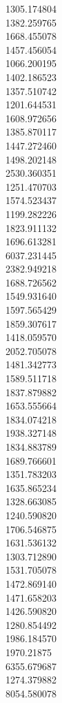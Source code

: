 1305.174804\\
1382.259765\\
1668.455078\\
1457.456054\\
1066.200195\\
1402.186523\\
1357.510742\\
1201.644531\\
1608.972656\\
1385.870117\\
1447.272460\\
1498.202148\\
2530.360351\\
1251.470703\\
1574.523437\\
1199.282226\\
1823.911132\\
1696.613281\\
6037.231445\\
2382.949218\\
1688.726562\\
1549.931640\\
1597.565429\\
1859.307617\\
1418.059570\\
2052.705078\\
1481.342773\\
1589.511718\\
1837.879882\\
1653.555664\\
1834.074218\\
1938.327148\\
1834.883789\\
1689.766601\\
1351.783203\\
1635.865234\\
1328.663085\\
1240.590820\\
1706.546875\\
1631.536132\\
1303.712890\\
1531.705078\\
1472.869140\\
1471.658203\\
1426.590820\\
1280.854492\\
1986.184570\\
1970.21875\\
6355.679687\\
1274.379882\\
8054.580078\\
